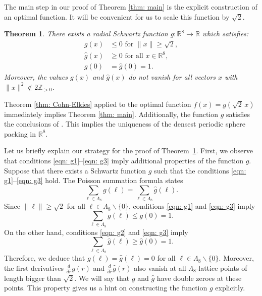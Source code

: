 \documentclass{scrartcl}
\newcommand{\R}{\mathbb{R}}
\newcommand{\Z}{\mathbb{Z}}
\newtheorem{theorem}{Theorem}
\begin{document}
 The main step in our proof of Theorem \ref{thm: main} is the explicit  construction of an optimal function. It will be convenient for us to scale this function by $\sqrt{2}$.
\begin{theorem}\label{thm: g}
There exists a radial Schwartz function $g:\R^8\to\R$ which satisfies:
\begin{align}
g(x)&\leq 0\mbox{ for } \|x\|\geq \sqrt{2}, \label{eqn: g1}\\
\widehat{g}(x)&\geq0\mbox{ for all } x\in\R^8,\label{eqn: g2}\\
g(0)&=\widehat{g}(0)=1.\label{eqn: g3}
\end{align}
Moreover, the values $g(x)$ and $\widehat{g}(x)$ do not vanish for all vectors $x$ with $\|x\|^2\notin 2\Z_{>0}$.
\end{theorem}
Theorem \ref{thm: Cohn-Elkies} applied to the optimal function $f(x)=g(\sqrt{2}\,x)$ immediately implies Theorem \ref{thm: main}. Additionally, the function $g$ satisfies the conclusions of \cite[Conjecture~8.1]{ElkiesCohn}. This implies the uniqueness of the densest periodic sphere packing in $\R^8$.

Let us briefly explain our strategy for the proof of Theorem~\ref{thm: g}. First, we observe that conditions \eqref{eqn: g1}--\eqref{eqn: g3} imply additional properties of the function $g$. Suppose that there exists a Schwartz function $g$ such that the conditions \eqref{eqn: g1}--\eqref{eqn: g3} hold. The Poisson summation formula states
\begin{equation}
 \sum_{\ell\in\Lambda_8}g(\ell)= \sum_{\ell\in\Lambda_8}\widehat{g}(\ell).
\end{equation}
Since $\|\ell\|\geq\sqrt{2}$ for all $\ell\in\Lambda_8\backslash\{0\}$, conditions \eqref{eqn: g1} and \eqref{eqn: g3} imply
\begin{equation}
  \sum_{\ell\in\Lambda_8}g(\ell)\leq g(0)=1.
\end{equation}
On the other hand, conditions \eqref{eqn: g2} and \eqref{eqn: g3} imply
\begin{equation}
  \sum_{\ell\in\Lambda_8}\widehat{g}(\ell)\geq \widehat{g}(0)=1.
\end{equation}
Therefore, we deduce that $g(\ell)=\widehat{g}(\ell)=0$ for all $\ell\in\Lambda_8\backslash\{0\}$. Moreover, the first derivatives $\frac{d}{dr}g(r)$ and $\frac{d}{dr}\widehat{g}(r)$ also vanish at all $\Lambda_8$-lattice points of length bigger than $\sqrt{2}$. We will say that $g$ and $\widehat{g}$ have double zeroes at these points. This property gives us a hint on constructing the function $g$ explicitly.
\end{document}
